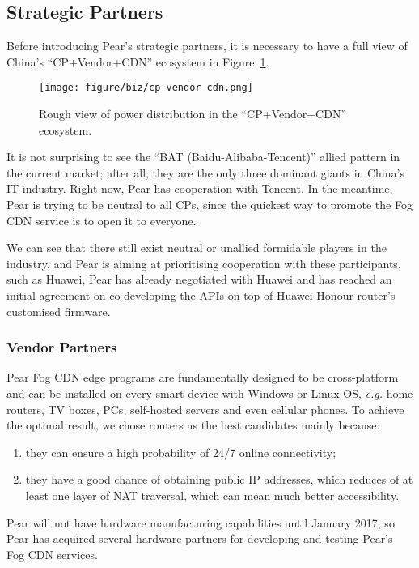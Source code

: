 \subsection{Strategic Partners}
Before introducing Pear's strategic partners, it is necessary to have a full view of China's “CP+Vendor+CDN” ecosystem in Figure~\ref{fig:cp-vendor-cdn}.
\begin{figure}[ht]
	\centering
	\texttt{[image: figure/biz/cp-vendor-cdn.png]}
	\caption{Rough view of power distribution in the ``CP+Vendor+CDN'' ecosystem.} \label{fig:cp-vendor-cdn}
\end{figure}

It is not surprising to see the ``BAT (Baidu-Alibaba-Tencent)'' allied pattern in the current market; after all, they are the only three dominant giants in China's IT industry. Right now, Pear has cooperation with Tencent. In the meantime, Pear is trying to be neutral to all CPs, since the quickest way to promote the Fog CDN service is to open it to everyone.

We can see that there still exist neutral or unallied formidable players in the industry, and Pear is aiming at prioritising cooperation with these participants, such as Huawei, Pear has already negotiated with Huawei and has reached an initial agreement on co-developing the APIs on top of Huawei Honour router's customised firmware. 

\subsubsection{Vendor Partners}
Pear Fog CDN edge programs are fundamentally designed to be cross-platform and can be installed on every smart device with Windows or Linux OS, {\em e.g.} home routers, TV boxes, PCs, self-hosted servers and even cellular phones. To achieve the optimal result, we chose routers as the best candidates mainly because:
\begin{enumerate}
	\item they can ensure a high probability of 24/7 online connectivity;
	\item they have a good chance of obtaining public IP addresses, which reduces of at least one layer of NAT traversal, which can mean much better accessibility. 
\end{enumerate}

Pear will not have hardware manufacturing capabilities until January 2017, so Pear has acquired several hardware partners for developing and testing Pear's Fog CDN services.

